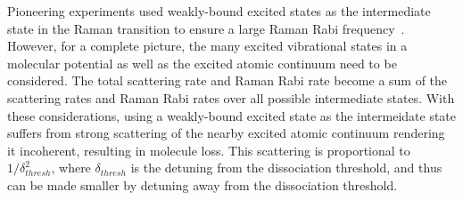 \documentclass[aps,prl,twocolumn,superscriptaddress]{revtex4-1}
\begin{document}
Pioneering experiments used weakly-bound excited states as the intermediate state in the Raman transition to ensure a large Raman Rabi frequency~\cite{Wynar2000,Rom2004}. However, for a complete picture, the many excited vibrational states in a molecular potential as well as the excited atomic continuum need to be considered. The total scattering rate and Raman Rabi rate become a sum of the scattering rates and Raman Rabi rates over all possible intermediate states. With these considerations, using a weakly-bound excited state as the intermeidate state suffers from strong scattering of the nearby excited atomic continuum rendering it incoherent, resulting in molecule loss. This scattering is proportional to $1/\delta_{thresh}^2$, where $\delta_{thresh}$ is the detuning from the dissociation threshold, and thus can  be made smaller by detuning away from the dissociation threshold.




\end{document}
